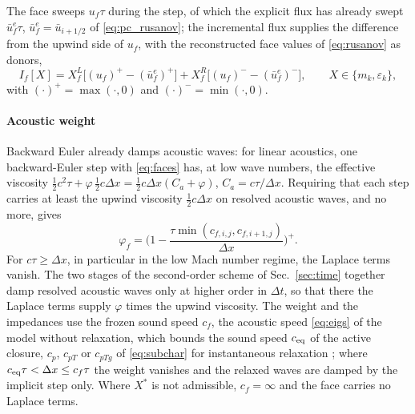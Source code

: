 The face sweeps $u_f\tau$ during the step, of which the explicit flux has already swept $\bar u^e_f\tau$, $\bar u^e_f=\bar u_{i+1/2}$ of \eqref{eq:pc_rusanov}; the
incremental flux supplies the difference from the upwind side of $u_f$, with the reconstructed face values of
\eqref{eq:rusanov} as donors,
\begin{equation}
I_f[X]=X^L_f\big[(u_f)^+-(\bar u^e_f)^+\big]+X^R_f\big[(u_f)^--(\bar u^e_f)^-\big],\qquad X\in\{m_k,\varepsilon_k\},
\label{eq:increment}
\end{equation}
with $(\cdot)^+=\max(\cdot,0)$ and $(\cdot)^-=\min(\cdot,0)$.

\paragraph{Acoustic weight}
Backward Euler already damps acoustic waves: for linear acoustics, one backward-Euler step with \eqref{eq:faces} has, at low wave
numbers, the effective viscosity $\tfrac12c^2\tau+\varphi\,\tfrac12c\Delta x=\tfrac12c\Delta x(C_a+\varphi)$, $C_a=c\tau/\Delta x$. Requiring that each step carries at least
the upwind viscosity $\tfrac12c\Delta x$ on resolved acoustic waves, and no more, gives
\begin{equation}
\varphi_f=\Big(1-\frac{\tau\min(c_{f,i,j},c_{f,i+1,j})}{\Delta x}\Big)^+ .
\label{eq:weight}
\end{equation}
For $c\tau\ge\Delta x$, in particular in the low Mach number
regime, the Laplace terms vanish. The two stages of the second-order scheme of Sec.~\ref{sec:time} together damp resolved acoustic waves only at higher order in $\Delta t$, so
that there the Laplace terms supply $\varphi$ times the upwind viscosity. The weight and the impedances use the frozen sound speed
$c_f$, the acoustic speed \eqref{eq:eigs} of the model without relaxation, which bounds the sound speed $c_{\rm eq}$ of the active
closure, $c_p$, $c_{pT}$ or $c_{pTg}$ of \eqref{eq:subchar} for instantaneous relaxation \cite{FlattenLund2011}; where $c_{\rm eq}\tau<\Delta x\le c_f\tau$ the
weight vanishes and the relaxed waves are damped by the implicit step only. Where $X^*$ is not admissible, $c_f=\infty$ and the face carries no Laplace terms.

